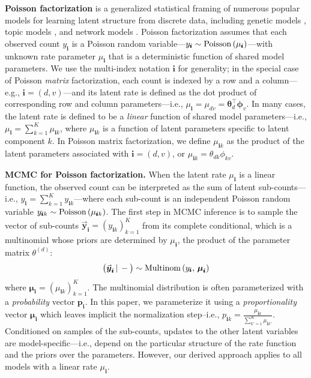 \documentclass{article}
\newcommand{\subs}{\pmb{i}}
\newcommand{\ysk}{y_{\subs k}}
\newcommand{\ys}{y_{\subs}}
\newcommand{\mus}{\mu_{\subs}}
\newcommand{\musk}{\mu_{\subs k}}
\newcommand{\yvs}{\vec{\boldsymbol{y}}_{\subs}}
\newcommand{\Multi}[1]{\textup{Multinom}\left( #1 \right)}
\newcommand{\Pois}[1]{\textup{Poisson}\left( #1 \right)}
\newcommand{\given}{\,|\,}
\newcommand{\teq}{\!=\!}
\newcommand{\compcond}[1]{\big(#1\given-\big)}
\begin{document}
  \textbf{Poisson factorization}
  \citep{titsias2008infinite,cemgil2009bayesian,zhou2012augment,gopalan2013efficient,paisley2014bayesian}
  is a generalized statistical framing of numerous popular models for learning
  latent structure from discrete data, including genetic models
  \citep{pritchard2000inference}, topic models \citep{blei2003latent}, and
  network models
  \citep{ball2011efficient,gopalan2013efficient,zhou2015infinite}. Poisson
  factorization assumes that each observed count $\ys$ is a Poisson random
  variable---$\ys \sim \Pois{\mus}$---with unknown rate parameter $\mus$ that is
  a deterministic function of shared model parameters. We use the multi-index
  notation $\subs$ for generality; in the special case of Poisson \emph{matrix}
  factorization, each count is indexed by a row and a column---e.g., $\subs
  \!=\! (d, v)$---and its latent rate is defined as the dot product of
  corresponding row and column parameters---i.e., $\mus \teq \mu_{dv} \teq
  \boldsymbol{\theta}_d^{\top} \boldsymbol{\phi}_v$. In many cases, the latent
  rate is defined to be a \emph{linear} function of shared model
  parameters---i.e., $\mus = \sum_{k=1}^K \musk$, where $\musk$ is a function of
  latent parameters specific to latent component $k$. In Poisson matrix
  factorization, we define $\musk$ as the product of the latent parameters
  associated with $\subs = (d, v)$, or $\musk = \theta_{dk}\phi_{kv}$.
  
  \textbf{MCMC for Poisson factorization.} When the latent rate $\mus$ is a linear
  function, the observed count can be interpreted as the sum of latent
  sub-counts---i.e., $\ys = \sum_{k=1}^K \ysk$---where each sub-count is an
  independent Poisson random variable $\ysk \sim \Pois{\musk}$. The first step
  in MCMC inference is to sample the vector of sub-counts $\yvs \teq
  \left(\ysk\right)_{k=1}^K$ from its complete conditional, which is a
  multinomial whose priors are determined by $\mus$, the product of the
  parameter matrix $\theta^{(d)}$:
  \begin{equation}
  \label{eqn:multinom}
  \compcond{\yvs} \sim \Multi{\ys,\, \boldsymbol{\mu}_{\subs}}
  \end{equation}
  where $\boldsymbol{\mu}_{\subs}\teq \left(\musk\right)_{k=1}^K$. The
  multinomial distribution is often parameterized with a \emph{probability}
  vector $\boldsymbol{p}_{\subs}$. In this paper, we parameterize it using a
  \emph{proportionality} vector $\boldsymbol{\mu}_{\subs}$ which leaves implicit
  the normalization step--i.e., $p_{\subs k} = \frac{\musk}{\sum_{k'=1}^K
  \mu_{\subs k'}}$. Conditioned on samples of the sub-counts, updates to the
  other latent variables are model-specific---i.e., depend on the particular
  structure of the rate function and the priors over the parameters. However,
  our derived approach applies to all models with a linear rate $\mus$. 
  
\end{document}
